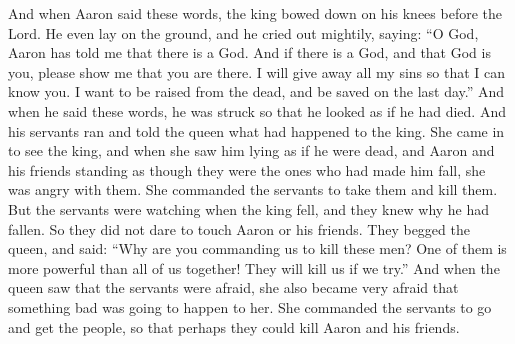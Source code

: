 And when Aaron said these words, the king bowed down on his knees before the Lord. He even lay on the ground, and he cried out mightily, saying:
\bverse \iffalse O God, Aaron hath told me that there is a God; and if there is a God, and if thou art God, wilt thou make thyself known unto me, and I will give away all my sins to know thee, and that I may be raised from the dead, and be saved at the last day. And now when the king had said these words, he was struck as if he were dead. \fi
``O God, Aaron has told me that there is a God. And if there is a God, and that God is you, please show me that you are there. I will give away all my sins so that I can know you. I want to be raised from the dead, and be saved on the last day.'' And when he said these words, he was struck so that he looked as if he had died.
\bverse \iffalse And it came to pass that his servants ran and told the queen all that had happened unto the king. And she came in unto the king; and when she saw him lay as if he were dead, and also Aaron and his brethren standing as though they had been the cause of his fall, she was angry with them, and commanded that her servants, or the servants of the king, should take them and slay them. \fi
And his servants ran and told the queen what had happened to the king. She came in to see the king, and when she saw him lying as if he were dead, and Aaron and his friends standing as though they were the ones who had made him fall, she was angry with them. She commanded the servants to take them and kill them.
\bverse \iffalse Now the servants had seen the cause of the king's fall, therefore they durst not lay their hands on Aaron and his brethren; and they pled with the queen saying: Why commandest thou that we should slay these men, when behold one of them is mightier than us all? Therefore we shall fall before them. \fi
But the servants were watching when the king fell, and they knew why he had fallen. So they did not dare to touch Aaron or his friends. They begged the queen, and said: ``Why are you commanding us to kill these men? One of them is more powerful than all of us together! They will kill us if we try.''
\bverse \iffalse Now when the queen saw the fear of the servants she also began to fear exceedingly, lest there should some evil come upon her. And she commanded her servants that they should go and call the people, that they might slay Aaron and his brethren. \fi
And when the queen saw that the servants were afraid, she also became very afraid that something bad was going to happen to her. She commanded the servants to go and get the people, so that perhaps they could kill Aaron and his friends.
